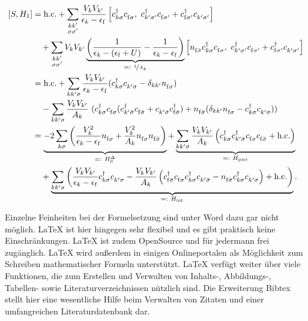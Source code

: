 \begin{align}
	\left[ S,  H_1 \right] &= \text{h.c.} + \sum_{\substack{k k'\\\sigma \sigma'}} \frac{V_k V_{k'}}{\epsilon_k - \epsilon_\mathrm{f}} \left[ \cre_{k \sigma} \anh_{\mathrm{f} \sigma},~ \cre_{k' \sigma'} \anh_{\mathrm{f} \sigma'} + \cre_{\mathrm{f} \sigma'} \anh_{k' \sigma'} \right] \\\nonumber
	&\quad+ \sum_{\substack{k k'\\\sigma \sigma'}} V_k V_{k'} \underbrace{\left( \frac{1}{\epsilon_k - (\epsilon_\mathrm{f} + U)} - \frac{1}{\epsilon_k - \epsilon_\mathrm{f}} \right)}_{=:~\nicefrac{1}{A_k}} \left[ \numb_{\mathrm{f} \bar \sigma} \cre_{k \sigma} \anh_{\mathrm{f} \sigma},~ \cre_{k' \sigma'} \anh_{\mathrm{f} \sigma'} + \cre_{\mathrm{f} \sigma'} \anh_{k' \sigma'} \right]\\
	&= \text{h.c.} + \sum_{k k' \sigma} \frac{V_k V_{k'}}{\epsilon_k - \epsilon_\mathrm{f}} (\cre_{k \sigma} \anh_{k' \sigma} - \delta_{k k'} \numb_{\mathrm{f} \sigma}) \\\nonumber
	&\quad- \sum_{k k' \sigma} \frac{V_k V_{k'}}{A_k} ~ ( \cre_{k \sigma} \anh_{\mathrm{f} \sigma} (\cre_{k' \bar\sigma} \anh_{\mathrm{f} \bar \sigma} + \anh_{k' \bar\sigma} \cre_{\mathrm{f} \bar\sigma}) + \numb_{\mathrm{f} \bar\sigma} (\delta_{k k'} \numb_{\mathrm{f} \sigma} - \cre_{k \sigma} \anh_{k' \sigma} ))\\
	&= \underbrace{-2\sum_{k \sigma} \left( \frac{V_k^2}{\epsilon_k - \epsilon_\mathrm{f}} \numb_{\mathrm{f} \sigma} + \frac{V_k^2}{A_k} \numb_{\mathrm{f} \sigma} \numb_{\mathrm{f} \bar\sigma} \right)}_{=:~ H_0^\Delta}+ \underbrace{\sum_{k k' \sigma} \frac{V_k V_{k'}}{A_k} \left(\cre_{k \sigma} \cre_{k' \bar\sigma} \anh_{\mathrm{f} \sigma} \anh_{\mathrm{f} \bar\sigma} + \text{h.c.} \right)}_{=:~H_\text{pair}}\\\nonumber
	&\quad+\underbrace{\sum_{k k' \sigma} \left( \frac{V_k V_{k'}}{\epsilon_k - \epsilon_\mathrm{f}} \cre_{k \sigma} \anh_{k' \sigma} - \frac{V_k V_{k'}}{A_k} \left(\cre_{\mathrm{f} \bar \sigma} \anh_{\mathrm{f} \sigma} \cre_{k \sigma} \anh_{k' \bar\sigma} - \numb_{\mathrm{f} \bar \sigma} \cre_{k \sigma} \anh_{k' \sigma} \right) + \text{h.c.} \right)}_{=:~H_\text{int}}.
\end{align}

Einzelne Feinheiten bei der Formelsetzung sind unter Word dazu gar nicht möglich. LaTeX ist hier hingegen sehr flexibel und es gibt praktisch keine Einschränkungen. LaTeX ist zudem OpenSource und für jedermann frei zugänglich. LaTeX wird außerdem in einigen Onlineportalen als Möglichkeit zum Schreiben mathematischer Formeln unterstützt. LaTeX verfügt weiter über viele Funktionen, die zum Erstellen und Verwalten von Inhalts-, Abbildungs-, Tabellen- sowie Literaturverzeichnissen nützlich sind. Die Erweiterung Bibtex stellt hier eine wesentliche Hilfe beim Verwalten von Zitaten und einer umfangreichen Literaturdatenbank dar.

